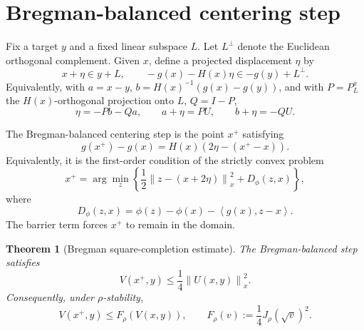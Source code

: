 \documentclass[11pt]{article}
\newtheorem{theorem}{Theorem}[section]
\newcommand{\ip}[2]{\left\langle #1,#2\right\rangle}
\newcommand{\norm}[1]{\left\|#1\right\|}
\begin{document}
\section{Bregman-balanced centering step}

Fix a target $y$ and a fixed linear subspace $L$.  Let $L^\perp$ denote the Euclidean orthogonal complement.  Given $x$, define a projected displacement $\eta$ by
\begin{equation}
  x+\eta\in y+L,
  \qquad
  -g(x)-H(x)\eta\in -g(y)+L^\perp.              \label{eq:eta-projected}
\end{equation}
Equivalently, with $a=x-y$, $b=H(x)^{-1}(g(x)-g(y))$, and with $P=P_L^x$ the $H(x)$-orthogonal projection onto $L$, $Q=I-P$,
\begin{equation}
  \eta=-Pb-Qa,
  \qquad
  a+\eta=PU,
  \qquad
  b+\eta=-QU.                                  \label{eq:eta-proj-identities}
\end{equation}

The Bregman-balanced centering step is the point $x^+$ satisfying
\begin{equation}
  g(x^+)-g(x)=H(x)\left(2\eta-(x^+-x)\right).        \label{eq:bregman-balance}
\end{equation}
Equivalently, it is the first-order condition of the strictly convex problem
\begin{equation}
  x^+=\arg\min_z\left\{
  \frac12\norm{z-(x+2\eta)}_x^2+D_\phi(z,x)
  \right\},                                      \label{eq:bregman-prox}
\end{equation}
where
\[
  D_\phi(z,x)=\phi(z)-\phi(x)-\ip{g(x)}{z-x}.
\]
The barrier term forces $x^+$ to remain in the domain.

\begin{theorem}[Bregman square-completion estimate]
The Bregman-balanced step satisfies
\begin{equation}
  V(x^+,y)\le \frac14\norm{U(x,y)}_x^2.             \label{eq:bregman-quarter-U}
\end{equation}
Consequently, under $\rho$-stability,
\begin{equation}
  V(x^+,y)\le F_\rho(V(x,y)),
  \qquad
  F_\rho(v):=\frac14 J_\rho(\sqrt v)^2.             \label{eq:F-rho-general}
\end{equation}
\end{theorem}
\end{document}
